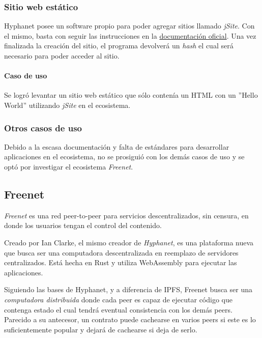 \subsubsection{Sitio web estático}

Hyphanet posee un software propio para poder agregar sitios llamado \textit{jSite}\cite{hyphanet-jsite}. Con el mismo, basta con seguir las instrucciones en la \href{https://www.hyphanet.org/pages/documentation.html}{documentación oficial}. Una vez finalizada la creación del sitio, el programa devolverá un \textit{hash} el cual será necesario para poder acceder al sitio.


\paragraph{Caso de uso}

Se logró levantar un sitio web estático que sólo contenía un HTML con un ''Hello World'' utilizando \textit{jSite}\cite{hyphanet-jsite} en el ecosistema.

\subsubsection{Otros casos de uso}

Debido a la escasa documentación y falta de estándares para desarrollar aplicaciones en el ecosistema, no se prosiguió con los demás casos de uso y se optó por investigar el ecosistema \textit{Freenet}.


\subsection{Freenet}

\textit{Freenet}\cite{freenet} es una red peer-to-peer para servicios descentralizados, sin censura, en donde los usuarios tengan el control del contenido.

Creado por Ian Clarke, el mismo creador de \textit{Hyphanet}\cite{hyphanet}, es una plataforma nueva que busca ser una computadora descentralizada en reemplazo de servidores centralizados. Está hecha en Rust y utiliza WebAssembly para ejecutar las aplicaciones.

Siguiendo las bases de Hyphanet, y a diferencia de IPFS, Freenet busca ser una \textit{computadora distribuida} donde cada peer es capaz de ejecutar código que contenga estado el cual tendrá eventual consistencia con los demás peers. Parecido a su antecesor, un contrato puede cachearse en varios peers si este es lo suficientemente popular y dejará de cachearse si deja de serlo.

